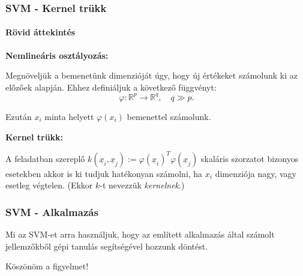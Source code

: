 \documentclass[11pt]{beamer}
\begin{document}
\begin{frame}
	\frametitle{SVM - Kernel trükk}
	\framesubtitle{Rövid áttekintés}
	\textbf{Nemlineáris osztályozás:}
	
	Megnöveljük a bemenetünk dimenzióját úgy, hogy új értékeket számolunk ki az előzőek alapján. Ehhez definiáljuk a következő függvényt:
	\[
	\varphi\colon \mathbb{R}^p \rightarrow \mathbb{R}^q, \quad q \gg p.
	\]
	
	Ezután $ x_i $ minta helyett $ \varphi(x_i) $ bemenettel számolunk.
	
	\textbf{Kernel trükk: }
	
	A feladatban szereplő $ k(\underline{x}_i, \underline{x}_j) := \varphi(\underline{x}_i)^T \varphi(\underline{x}_j) $ skaláris szorzatot bizonyos esetekben akkor is ki tudjuk hatékonyan számolni, ha $ x_i $ dimenziója nagy, vagy esetleg végtelen. (Ekkor $ k $-t nevezzük \textit{kernelnek}.)
	


\end{frame}

%	
%	
%
%		
%
%


\begin{frame}
	\frametitle{SVM - Alkalmazás}
	
	Mi az SVM-et arra használjuk, hogy az említett alkalmazás által számolt jellemzőkből gépi tanulás segítségével hozzunk döntést.
	

\end{frame}





\begin{frame}

	\centering
	Köszönöm a figyelmet!

\end{frame}
\end{document}
